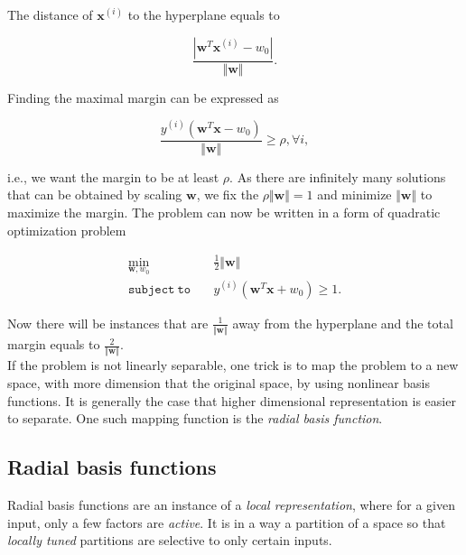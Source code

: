 The distance of $\mathbf{x}^{(i)}$ to the hyperplane equals to 

\begin{equation}
	\frac{ | \mathbf{w}^T\mathbf{x}^{(i)} - w_0 | }{ \Vert \mathbf{w} \Vert}.
\end{equation}

Finding the maximal margin can be expressed as

\begin{equation}
	\frac{y^{(i)}(\mathbf{w}^T\mathbf{x} - w_0)}{\Vert \mathbf{w} \Vert} \geq \rho, \forall i,
\end{equation}

i.e., we want the margin to be at least $\rho$. As there are infinitely many solutions that can be obtained by scaling $\mathbf{w}$, we fix the $\rho \Vert \mathbf{w} \Vert = 1$ and minimize $\Vert \mathbf{w} \Vert$ to maximize the margin. The problem can now be written in a form of quadratic optimization problem

\begin{align*}
	\min_{\mathbf{w}, w_0} & \quad \frac{1}{2} \Vert \mathbf{w} \Vert \\
	\mathtt{subject \ to} & \quad  y^{(i)} \left ( \mathbf{w}^T\mathbf{x} + w_0  \right ) \geq 1.
\end{align*}

Now there will be instances that are $\frac{1}{\Vert \mathbf{w} \Vert}$ away from the hyperplane and the total margin equals to $\frac{2}{\Vert \mathbf{w} \Vert}$. \\

If the problem is not linearly separable, one trick is to map the problem to a new space, with more dimension that the original space, by using nonlinear basis functions. It is generally the case that higher dimensional representation is easier to separate. One such mapping function is the \textit{radial basis function}. 


 
\subsection{Radial basis functions}

Radial basis functions are an instance of a \textit{local representation}, where for a given input, only a few factors are \textit{active}. It is in a way a partition of a space so that \textit{locally tuned} partitions are selective to only certain inputs. \\

